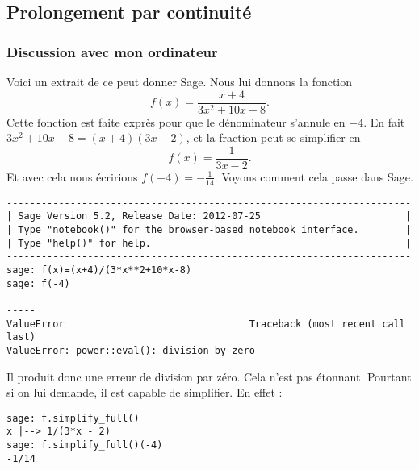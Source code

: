 \subsection{Prolongement par continuité}

\subsubsection{Discussion avec mon ordinateur}

Voici un extrait de ce peut donner Sage. Nous lui donnons la fonction
\begin{equation}    \label{EqyEHTBZ}
    f(x)=\frac{ x+4 }{ 3x^2+10x-8 }.
\end{equation}
Cette fonction est faite exprès pour que le dénominateur s'annule en \( -4\). En fait \( 3x^2+10x-8=(x+4)(3x-2)\), et la fraction peut se simplifier en
\begin{equation}
    f(x)=\frac{1}{ 3x-2 }.
\end{equation}
Et avec cela nous écririons \( f(-4)=-\frac{1}{ 14 }\). Voyons comment cela passe dans Sage.

\begin{verbatim}
----------------------------------------------------------------------
| Sage Version 5.2, Release Date: 2012-07-25                         |
| Type "notebook()" for the browser-based notebook interface.        |
| Type "help()" for help.                                            |
----------------------------------------------------------------------
sage: f(x)=(x+4)/(3*x**2+10*x-8)
sage: f(-4)
---------------------------------------------------------------------------
ValueError                                Traceback (most recent call last)
ValueError: power::eval(): division by zero
\end{verbatim}
Il produit donc une erreur de division par zéro. Cela n'est pas étonnant. Pourtant si on lui demande, il est capable de simplifier. En effet :
\begin{verbatim}
sage: f.simplify_full()
x |--> 1/(3*x - 2)
sage: f.simplify_full()(-4)
-1/14
\end{verbatim}

